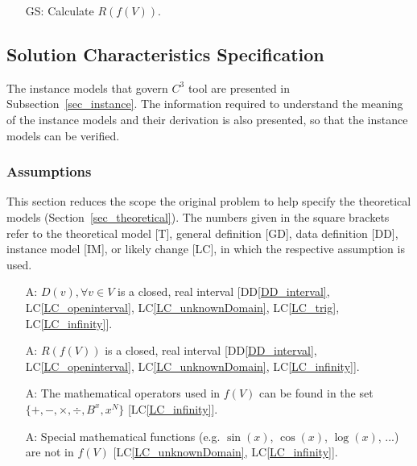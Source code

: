 \documentclass[12pt]{article}
\newcommand{\ddref}[1]{DD\ref{#1}}
\newcounter{assumpnum} %
\newcounter{goalnum} %
\newcommand{\lcref}[1]{LC\ref{#1}}
\newcommand{\prognameAbbrv}{$C^{3}$}
\begin{document}
\begin{itemize}

\item[GS\refstepcounter{goalnum}\thegoalnum \label{G_range}:] 
Calculate $R(f(V))$.



\end{itemize}

\subsection{Solution Characteristics Specification}
The instance models that govern \prognameAbbrv{} tool are presented in
Subsection~\ref{sec_instance}. The information required to understand the 
meaning of the instance models and their derivation is also presented, so that 
the instance models can be verified.

\subsubsection{Assumptions}
This section reduces the scope the original problem to help specify the 
theoretical models (Section~\ref{sec_theoretical}). The numbers given in the 
square brackets refer to the theoretical model [T], general definition [GD], 
data definition [DD], instance model [IM], or likely change [LC], in which the 
respective assumption is used.

\begin{itemize}

\item[A\refstepcounter{assumpnum}\theassumpnum \label{A_domain}:] $D(v), 
\forall v \in V$ is a closed, real interval [\ddref{DD_interval}, 
\lcref{LC_openinterval}, \lcref{LC_unknownDomain}, \lcref{LC_trig}, 
\lcref{LC_infinity}]. 

\item[A\refstepcounter{assumpnum}\theassumpnum \label{A_interval}:] $R(f(V))$ 
is a closed, real interval [\ddref{DD_interval}, \lcref{LC_openinterval}, 
\lcref{LC_unknownDomain}, \lcref{LC_infinity}].

\item[A\refstepcounter{assumpnum}\theassumpnum \label{A_operators}:] The 
mathematical operators used in $f(V)$ can be found in the set $\{+, -, 
\times, \div, B^x, x^N \}$ [\lcref{LC_infinity}].

\item[A\refstepcounter{assumpnum}\theassumpnum \label{A_commonfunctions}:] 
Special mathematical functions (e.g. $\sin(x)$, $\cos(x)$, $\log(x)$, ...) are 
not in $f(V)$ [\lcref{LC_unknownDomain}, \lcref{LC_infinity}].

\end{itemize}
\end{document}
